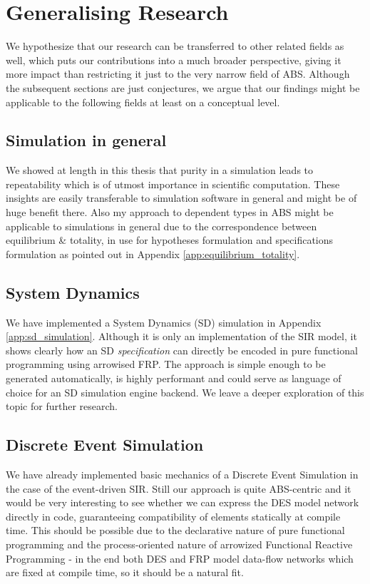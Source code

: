 \section{Generalising Research}
We hypothesize that our research can be transferred to other related fields as well, which puts our contributions into a much broader perspective, giving it more impact than restricting it just to the very narrow field of ABS. Although the subsequent sections are just conjectures, we argue that our findings might be applicable to the following fields at least on a conceptual level.

\subsection{Simulation in general}
We showed at length in this thesis that purity in a simulation leads to repeatability which is of utmost importance in scientific computation. These insights are easily transferable to simulation software in general and might be of huge benefit there. Also my approach to dependent types in ABS might be applicable to simulations in general due to the correspondence between equilibrium \& totality, in use for hypotheses formulation and specifications formulation as pointed out in Appendix \ref{app:equilibrium_totality}. 

\subsection{System Dynamics}
We have implemented a System Dynamics (SD) simulation in Appendix \ref{app:sd_simulation}. Although it is only an implementation of the SIR model, it shows clearly how an SD \textit{specification} can directly be encoded in pure functional programming using arrowised FRP. The approach is simple enough to be generated automatically, is highly performant and could serve as language of choice for an SD simulation engine backend. We leave a deeper exploration of this topic for further research.

\subsection{Discrete Event Simulation}
We have already implemented basic mechanics of a Discrete Event Simulation in the case of the event-driven SIR. Still our approach is quite ABS-centric and it would be very interesting to see whether we can express the DES model network directly in code, guaranteeing compatibility of elements statically at compile time. This should be possible due to the declarative nature of pure functional programming and the process-oriented nature of arrowized Functional Reactive Programming - in the end both DES and FRP model data-flow networks which are fixed at compile time, so it should be a natural fit.

